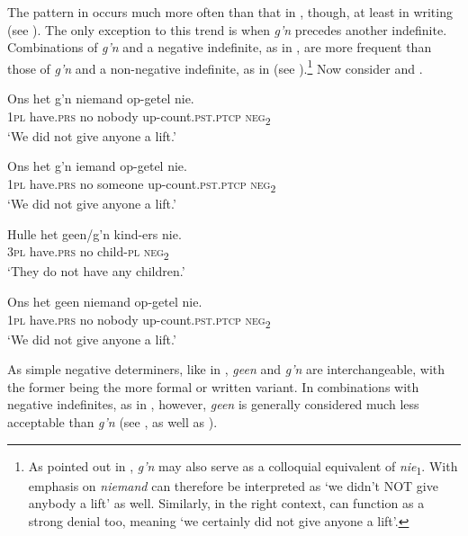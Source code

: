 \documentclass[output=paper,colorlinks,citecolor=brown]{langscibook}
\begin{document}
The pattern in  occurs much more often than that in , though, at least in writing (see \citealt[139]{Huddlestone2010}). The only exception to this trend is when \textit{g’n} precedes another indefinite. Combinations of \textit{g’n} and a negative indefinite, as in , are more frequent than those of \textit{g’n} and a non-negative indefinite, as in  (see \citealt[137]{Huddlestone2010}).\footnote{As pointed out in , \textit{g’n} may also serve as a colloquial equivalent of \textit{nie}\textsubscript{1}. With emphasis on \textit{niemand}  can therefore be interpreted as ‘we didn’t NOT give anybody a lift’ as well. Similarly, in the right context,  can function as a strong denial too, meaning ‘we certainly did not give anyone a lift’.} Now consider  and .

\ea\label{ex:afr:30}
    \ea\label{ex:afr:30a}
        \gll Ons het g’n niemand op-getel nie. \\ 
             \textsc{1pl} have.\textsc{prs} no nobody up-count.\textsc{pst.ptcp} \textsc{neg}\textsubscript{2} \\
        \glt ‘We did not give anyone a lift.’
    
    \ex\label{ex:afr:30b}
        \gll Ons het g’n iemand op-getel nie. \\
             \textsc{1pl} have.\textsc{prs} no someone up-count.\textsc{pst.ptcp} \textsc{neg}\textsubscript{2}  \\
        \glt ‘We did not give anyone a lift.’
    
    \ex\label{ex:afr:30c}
        \gll Hulle het geen/g’n kind-ers nie. \\ 
             \textsc{3pl} have.\textsc{prs} no child-\textsc{pl} \textsc{neg}\textsubscript{2} \\
        \glt ‘They do not have any children.’
    
    \ex\label{ex:afr:30d}
        \gll Ons het geen niemand op-getel nie. \\
             \textsc{1pl} have.\textsc{prs} no nobody up-count.\textsc{pst.ptcp} \textsc{neg}\textsubscript{2}\\
        \glt ‘We did not give anyone a lift.’ 
    
    \z
\z 


As simple negative determiners, like in , \textit{geen} and \textit{g’n} are interchangeable, with the former being the more formal or written variant. In combinations with negative indefinites, as in , however, \textit{geen} is generally considered much less acceptable than \textit{g’n} (see \citealt[167]{Huddlestone2010}, as well as ).
\end{document}
